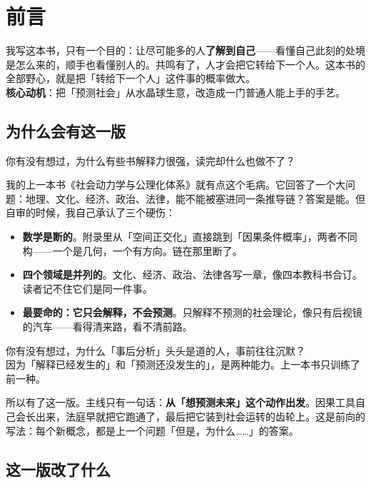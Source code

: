 \documentclass[../main2.tex]{subfiles}
\begin{document}
\chapter*{前言}

\begin{motivation}
	我写这本书，只有一个目的：让尽可能多的人\textbf{了解到自己}——看懂自己此刻的处境是怎么来的，顺手也看懂别人的。共鸣有了，人才会把它转给下一个人。这本书的全部野心，就是把「转给下一个人」这件事的概率做大。\\
	\textbf{核心动机}：把「预测社会」从水晶球生意，改造成一门普通人能上手的手艺。
\end{motivation}

\section{为什么会有这一版}

你有没有想过，为什么有些书解释力很强，读完却什么也做不了？

我的上一本书《社会动力学与公理化体系》就有点这个毛病。它回答了一个大问题：地理、文化、经济、政治、法律，能不能被塞进同一条推导链？答案是能。但自审的时候，我自己承认了三个硬伤：

\begin{itemize}
	\item \textbf{数学是断的}。附录里从「空间正交化」直接跳到「因果条件概率」，两者不同构——一个是几何，一个有方向。链在那里断了。
	\item \textbf{四个领域是并列的}。文化、经济、政治、法律各写一章，像四本教科书合订。读者记不住它们是同一件事。
	\item \textbf{最要命的：它只会解释，不会预测}。只解释不预测的社会理论，像只有后视镜的汽车——看得清来路，看不清前路。
\end{itemize}

\begin{readingnote}
	你有没有想过，为什么「事后分析」头头是道的人，事前往往沉默？\\
	因为「解释已经发生的」和「预测还没发生的」，是两种能力。上一本书只训练了前一种。
\end{readingnote}

所以有了这一版。主线只有一句话：\textbf{从「想预测未来」这个动作出发}。因果工具自己会长出来，法庭早就把它跑通了，最后把它装到社会运转的齿轮上。这是前向的写法：每个新概念，都是上一个问题「但是，为什么……」的答案。

\section{这一版改了什么}
\end{document}
